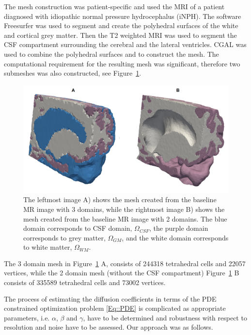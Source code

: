 \documentclass[12pt,a4paper]{article}
\begin{document}
The mesh construction was patient-specific and used the MRI of a patient diagnosed with idiopathic normal pressure hydrocephalus (iNPH). The software Freesurfer was used to segment and create the polyhedral surfaces of the white and cortical grey matter. Then the T2 weighted MRI \cite{ringstad2018brain} was used to segment the CSF compartment surrounding the cerebral and the lateral ventricles. CGAL \cite{cgal:rty-m3-18b} was used to combine the polyhedral surfaces and to construct the mesh. The computational requirement for the resulting mesh was significant, therefore two submeshes was also constructed, see Figure~\ref{Fig::Mesh}.
\begin{figure}
\centering
\includegraphics[scale=0.2]{../mesh.png} 
\caption{The leftmost image A) shows the mesh created from the baseline MR image with 3 domains, while the rightmost image  B) shows the mesh created from the baseline MR image with 2 domains. The blue domain corresponds to CSF domain, $\Omega_{CSF}$, the purple domain corresponds to grey matter,  $\Omega_{GM}$, and the white domain corresponds to white matter, $\Omega_{WM}$. }
\label{Fig::Mesh}
\end{figure}
The 3 domain mesh in Figure~\ref{Fig::Mesh} A, consists of 244318 tetrahedral cells and 22057 vertices, while the 2 domain mesh (without the CSF compartment) Figure~\ref{Fig::Mesh} B consists of 335589 tetrahedral cells and 73002 vertices. 

The process of estimating the diffusion coefficients in terms of the PDE constrained optimization problem \eqref{Eq::PDE} is complicated as appropriate parameters, i.e. $\alpha$, $\beta$ and $\gamma$,  have 
to be determined and robustness with respect to resolution and noise have to be assessed. Our approach was as follows.  
\end{document}
